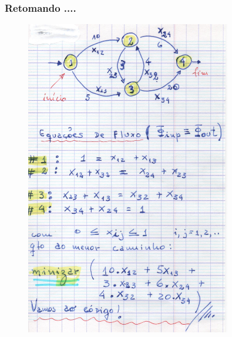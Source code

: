 \documentclass{beamer}
\begin{document}
\begin{frame}
\frametitle{Retomando ....}

\begin{figure}[ht!]
 \centering
 \includegraphics[width=0.8\textwidth , height=0.85\textheight]{10_grafo_equacoes.pdf}
\end{figure}

\end{frame}






\end{document}
